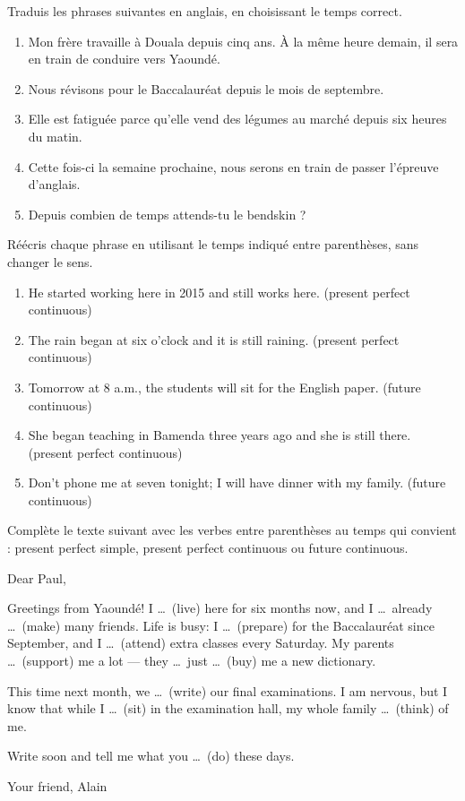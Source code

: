 \documentclass[11pt]{article}
\newcounter{popsec}
\newcounter{popsub}
\newcommand{\courssub}[1]{%
  \stepcounter{popsub}%
  \par\vspace{9pt}\noindent{\popxbold\fontsize{11.5}{13}\selectfont\color{popink}{\color{poporange}\thepopsec.\thepopsub}\hspace{6pt}#1}\par\nopagebreak\vspace{4pt}
}
\begin{document}
\courssub{Je m'entraîne}

\begin{exercice}
Traduis les phrases suivantes en anglais, en choisissant le temps correct.
\begin{enumerate}
\item Mon frère travaille à Douala depuis cinq ans. À la même heure demain, il sera en train de conduire vers Yaoundé.
\item Nous révisons pour le Baccalauréat depuis le mois de septembre.
\item Elle est fatiguée parce qu'elle vend des légumes au marché depuis six heures du matin.
\item Cette fois-ci la semaine prochaine, nous serons en train de passer l'épreuve d'anglais.
\item Depuis combien de temps attends-tu le bendskin ?
\end{enumerate}
\end{exercice}

\begin{exercice}
Réécris chaque phrase en utilisant le temps indiqué entre parenthèses, sans changer le sens.
\begin{enumerate}
\item He started working here in 2015 and still works here. (present perfect continuous)
\item The rain began at six o'clock and it is still raining. (present perfect continuous)
\item Tomorrow at 8 a.m., the students will sit for the English paper. (future continuous)
\item She began teaching in Bamenda three years ago and she is still there. (present perfect continuous)
\item Don't phone me at seven tonight; I will have dinner with my family. (future continuous)
\end{enumerate}
\end{exercice}

\begin{exercice}
Complète le texte suivant avec les verbes entre parenthèses au temps qui convient : present perfect simple, present perfect continuous ou future continuous.
\begin{textebox}
Dear Paul,

Greetings from Yaoundé! I \ldots\ (live) here for six months now, and I \ldots\ already \ldots\ (make) many friends. Life is busy: I \ldots\ (prepare) for the Baccalauréat since September, and I \ldots\ (attend) extra classes every Saturday. My parents \ldots\ (support) me a lot — they \ldots\ just \ldots\ (buy) me a new dictionary.

This time next month, we \ldots\ (write) our final examinations. I am nervous, but I know that while I \ldots\ (sit) in the examination hall, my whole family \ldots\ (think) of me.

Write soon and tell me what you \ldots\ (do) these days.

Your friend,
Alain
\end{textebox}
\end{exercice}
\end{document}
